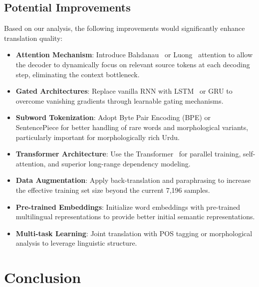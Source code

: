 \documentclass[runningheads]{llncs}
\begin{document}
\subsection{Potential Improvements}

Based on our analysis, the following improvements would significantly enhance translation quality:

\begin{itemize}
    \item \textbf{Attention Mechanism}: Introduce Bahdanau~\cite{bahdanau2015neural} or Luong~\cite{luong2015effective} attention to allow the decoder to dynamically focus on relevant source tokens at each decoding step, eliminating the context bottleneck.
    
    \item \textbf{Gated Architectures}: Replace vanilla RNN with LSTM~\cite{hochreiter1997long} or GRU to overcome vanishing gradients through learnable gating mechanisms.
    
    \item \textbf{Subword Tokenization}: Adopt Byte Pair Encoding (BPE) or SentencePiece for better handling of rare words and morphological variants, particularly important for morphologically rich Urdu.
    
    \item \textbf{Transformer Architecture}: Use the Transformer~\cite{vaswani2017attention} for parallel training, self-attention, and superior long-range dependency modeling.
    
    \item \textbf{Data Augmentation}: Apply back-translation and paraphrasing to increase the effective training set size beyond the current 7,196 samples.
    
    \item \textbf{Pre-trained Embeddings}: Initialize word embeddings with pre-trained multilingual representations to provide better initial semantic representations.
    
    \item \textbf{Multi-task Learning}: Joint translation with POS tagging or morphological analysis to leverage linguistic structure.
\end{itemize}

\section{Conclusion}\label{sec:conclusion}
\end{document}
